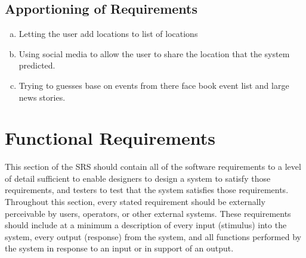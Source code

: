 \documentclass[titlepage]{article}
\begin{document}
		\subsection{Apportioning of Requirements}
		\label{sub:apportioning_of_requirements}
		\begin{enumerate}[a)]
			\item Letting the user add locations to list of locations
			\item Using social media to allow the user to share the location that the system predicted.
			\item Trying to guesses base on events from there face book event list and large news stories.
			
		\end{enumerate}
		\section{Functional Requirements}
		\label{sec:functional_requirements}
		This section of the SRS should contain all of the software requirements to a level of detail sufficient to enable designers to design a system to satisfy those requirements, and testers to test that the system satisfies those requirements. Throughout this section, every stated requirement should be externally perceivable by users, operators, or other external systems. These requirements should include at a minimum a description of every input (stimulus) into the system, every output (response) from the system, and all functions performed by the system in response to an input or in support of an output.
\end{document}

